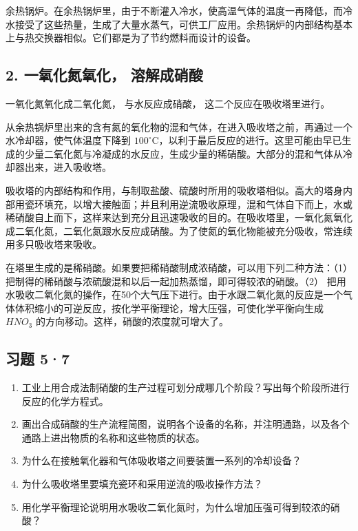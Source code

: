 余热锅炉。在余热锅炉里，由于不断灌入冷水，使高温气体的温度一再降低，而冷水接受了这些热量，生成了大量水蒸气，可供工厂应用。余热锅炉的内部结构基本上与热交换器相似。它们都是为了节约燃料而设计的设备。

\subsection{2. 一氧化氮氧化， 溶解成硝酸}

一氧化氮氧化成二氧化氮， 与水反应成硝酸， 这二个反应在吸收塔里进行。

从余热锅炉里出来的含有氮的氧化物的混和气体，在进入吸收塔之前，再通过一个水冷却器，使气体温度下降到
\(100^{\circ}\mathrm{C}\)，以利于最后反应的进行。这里可能由早已生成的少量二氧化氮与冷凝成的水反应，生成少量的稀硝酸。大部分的混和气体从冷却器出来，进入吸收塔。

吸收塔的内部结构和作用，与制取盐酸、硫酸时所用的吸收塔相似。高大的塔身内部用瓷环填充，以增大接触面；并且利用逆流吸收原理，混和气体自下而上，水或稀硝酸自上而下，这样来达到充分且迅速吸收的目的。在吸收塔里，一氧化氮氧化成二氧化氮，二氧化氮跟水反应成硝酸。为了使氮的氧化物能被充分吸收，常连续用多只吸收塔来吸收。

在塔里生成的是稀硝酸。如果要把稀硝酸制成浓硝酸，可以用下列二种方法：（1）
把制得的稀硝酸与浓硫酸混和以后一起加热蒸馏，即可得较浓的硝酸。（2）
把用水吸收二氧化氮的操作，在50个大气压下进行。由于水跟二氧化氮的反应是一个气体体积缩小的可逆反应，按化学平衡理论，增大压强，可使化学平衡向生成
\(HNO_{3}\) 的方向移动。这样，硝酸的浓度就可增大了。

\subsection{习题 5·7}

\begin{enumerate}
\item
  工业上用合成法制硝酸的生产过程可划分成哪几个阶段？写出每个阶段所进行反应的化学方程式。
\item
  画出合成硝酸的生产流程简图，说明各个设备的名称，并注明通路，以及各个通路上进出物质的名称和这些物质的状态。
\item
  为什么在接触氧化器和气体吸收塔之间要装置一系列的冷却设备？
\item
  为什么吸收塔里要填充瓷环和采用逆流的吸收操作方法？
\item
  用化学平衡理论说明用水吸收二氧化氮时，为什么增加压强可得到较浓的硝酸？
\end{enumerate}

